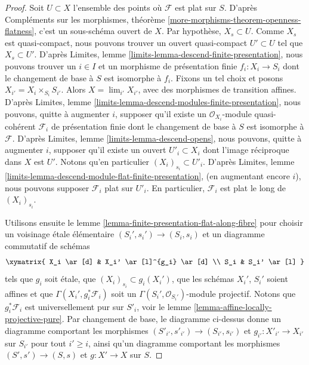\begin{proof}
Soit $U \subset X$ l'ensemble des points où $\mathcal{F}$ est
plat sur $S$. D'après
Compléments sur les morphismes, théorème \ref{more-morphisms-theorem-openness-flatness},
c'est un sous-schéma ouvert de $X$. Par hypothèse, $X_s \subset U$.
Comme $X_s$ est quasi-compact, nous pouvons trouver un ouvert quasi-compact
$U' \subset U$ tel que $X_s \subset U'$. D'après
Limites, lemme \ref{limits-lemma-descend-finite-presentation},
nous pouvons trouver un $i \in I$ et un morphisme de présentation finie
$f_i : X_i \to S_i$ dont le changement de base à $S$ est isomorphe à $f_i$.
Fixons un tel choix et posons $X_{i'} = X_i \times_{S_i} S_{i'}$.
Alors $X = \lim_{i'} X_{i'}$, avec des morphismes de transition affines. D'après
Limites, lemme \ref{limits-lemma-descend-modules-finite-presentation},
nous pouvons, quitte à augmenter $i$, supposer qu'il existe un
$\mathcal{O}_{X_i}$-module quasi-cohérent $\mathcal{F}_i$
de présentation finie dont le changement de base à $S$ est isomorphe à
$\mathcal{F}$. D'après
Limites, lemme \ref{limits-lemma-descend-opens},
nous pouvons, quitte à augmenter $i$, supposer qu'il existe un
ouvert $U'_i \subset X_i$ dont l'image réciproque dans $X$ est $U'$.
Notons qu'en particulier $(X_i)_{s_i} \subset U'_i$. D'après
Limites, lemme \ref{limits-lemma-descend-module-flat-finite-presentation},
(en augmentant encore $i$),
nous pouvons supposer $\mathcal{F}_i$ plat sur $U'_i$.
En particulier, $\mathcal{F}_i$ est plat le long de $(X_i)_{s_i}$.

\medskip\noindent
Utilisons ensuite le
lemme \ref{lemma-finite-presentation-flat-along-fibre}
pour choisir un voisinage \'etale élémentaire
$(S_i', s_i') \to (S_i, s_i)$ et un diagramme commutatif de schémas
$$
\xymatrix{
X_i \ar[d] & X_i' \ar[l]^{g_i} \ar[d] \\
S_i & S_i' \ar[l]
}
$$
tels que $g_i$ soit \'etale, que $(X_i)_{s_i} \subset g_i(X_i')$, que les schémas
$X_i'$, $S_i'$ soient affines et que
$\Gamma(X_i', g_i^*\mathcal{F}_i)$ soit un
$\Gamma(S_i', \mathcal{O}_{S_i'})$-module projectif.
Notons que $g_i^*\mathcal{F}_i$ est universellement pur sur $S'_i$, voir le
lemme \ref{lemma-affine-locally-projective-pure}.
Par changement de base, le diagramme ci-dessus donne un diagramme comportant les morphismes
$(S'_{i'}, s'_{i'}) \to (S_{i'}, s_{i'})$ et
$g_{i'} : X'_{i'} \to X_{i'}$ sur $S_{i'}$
pour tout $i' \geq i$, ainsi qu'un diagramme
comportant les morphismes $(S', s') \to (S, s)$ et $g : X' \to X$ sur $S$.


\end{proof}
